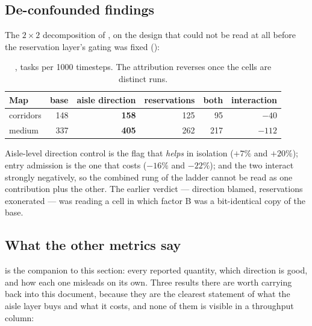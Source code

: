 \subsection{De-confounded findings}
\label{sec:results-factorial}

The $2 \times 2$ decomposition of , on the design that could
not be read at all before the reservation layer's gating was fixed
():

\begin{table}[H]
\centering\small
\begin{tabular}{@{}lrrrrr@{}}
\toprule
\textbf{Map} & \textbf{base} & \textbf{aisle direction} & \textbf{reservations} & \textbf{both} & \textbf{interaction} \\
\midrule
corridors & 148 & \textbf{158} & 125 & 95 & $-40$ \\
medium & 337 & \textbf{405} & 262 & 217 & $-112$ \\
\bottomrule
\end{tabular}
\caption{, tasks per 1000 timesteps.
The attribution reverses once the cells are distinct runs.}
\label{tab:factorial}
\end{table}

Aisle-level direction control is the flag that \emph{helps} in isolation
($+7\%$ and $+20\%$); entry admission is the one that costs ($-16\%$ and
$-22\%$); and the two interact strongly negatively, so the combined rung of the
ladder cannot be read as one contribution plus the other. The earlier verdict
--- direction blamed, reservations exonerated --- was reading a cell in which
factor B was a bit-identical copy of the base.

\subsection{What the other metrics say}
\label{sec:results-other-metrics}

 is the companion to this section: every reported
quantity, which direction is good, and how each one misleads on its own. Three
results there are worth carrying back into this document, because they are the
clearest statement of what the aisle layer buys and what it costs, and none of
them is visible in a throughput column:

